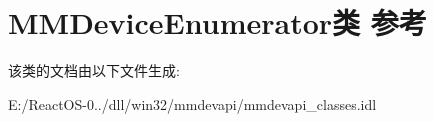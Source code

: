 \hypertarget{class_m_m_device_enumerator}{}\section{M\+M\+Device\+Enumerator类 参考}
\label{class_m_m_device_enumerator}


该类的文档由以下文件生成\+:\begin{DoxyCompactItemize}
\item 
E\+:/\+React\+O\+S-\/0../dll/win32/mmdevapi/mmdevapi\+\_\+classes.\+idl\end{DoxyCompactItemize}
